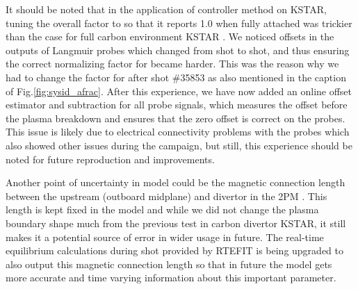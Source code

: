 It should be noted that in the application of \Afrac{} controller method on KSTAR, tuning the overall factor to \Afrac{} so that it reports 1.0 when fully attached was trickier than the case for full carbon environment KSTAR \cite{Eldon_2022_PPCF}.
We noticed offsets in the outputs of Langmuir probes which changed from shot to shot, and thus ensuring the correct normalizing factor for \Afrac{} became harder.
This was the reason why we had to change the factor for \Afrac{} after shot \#35853 as also mentioned in the caption of Fig.\ref{fig:sysid_afrac}.
After this experience, we have now added an online offset estimator and subtraction for all probe signals, which measures the offset before the plasma breakdown and ensures that the zero offset is correct on the probes.
This issue is likely due to electrical connectivity problems with the probes which also showed other issues during the campaign, but still, this experience should be noted for future reproduction and improvements.

Another point of uncertainty in \Afrac{} model could be the magnetic connection length between the upstream (outboard midplane) and divertor in the 2PM \cite{Leonard_2018_PPCF}.
This length is kept fixed in the model and while we did not change the plasma boundary shape much from the previous test \cite{Eldon_2022_PPCF} in carbon divertor KSTAR, it still makes it a potential source of error in wider usage in future.
The real-time equilibrium calculations during shot provided by RTEFIT is being upgraded to also output this magnetic connection length so that in future the model gets more accurate and time varying information about this important parameter.


